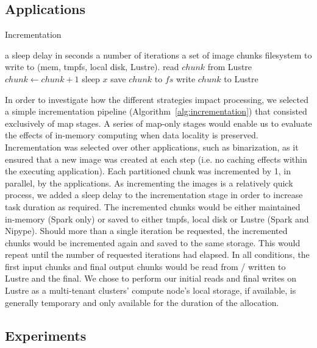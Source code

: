 \documentclass{IEEEtran}
\newcommand{\Desc}[2]{\State \makebox[2em][l]{#1}#2}
\begin{document}
\subsection{Applications} %
\begin{algorithm}\caption{Incrementation}\label{alg:incrementation}
    \begin{algorithmic}[1]
    \Input
    \Desc{$x$}{a sleep delay in seconds}
    \Desc{$n$}{a number of iterations}
    \Desc{$C$}{a set of image chunks}
    \Desc{$fs$}{filesystem to write to (mem, tmpfs, local disk, Lustre).}
    \EndInput
    \State read $chunk$ from Lustre
        \State $chunk\gets chunk+1$
        \State sleep $x$
        \State save $chunk$ to $fs$
        \EndIf
    \EndFor
    \State write $chunk$ to Lustre
    \EndFor
\end{algorithmic}
\end{algorithm}

In order to investigate how the different strategies impact processing, we 
selected a simple incrementation pipeline (Algorithm~\ref{alg:incrementation}) 
that consisted exclusively of map 
stages. A series of map-only stages would enable us to evaluate the effects of
in-memory computing when data locality is preserved. Incrementation was 
selected 
over other applications, such as binarization, as it ensured that a new image
was created at each step (i.e. no caching effects within the executing 
application). Each partitioned chunk was incremented by 1, in parallel, by
the applications. As incrementing the images is a relatively quick 
process, we added a sleep delay to the incrementation stage in order to 
increase task duration as required. The incremented chunks would be either 
maintained in-memory (Spark only) or saved to either tmpfs, local disk or 
Lustre (Spark and Nipype). Should more than a single iteration be requested, 
the incremented chunks would be incremented again and saved to the same storage. 
This would repeat until the number of requested iterations had elapsed. In all 
conditions, the first input chunks and final output chunks would be read from / written to  Lustre and the final. 
We chose to perform our initial 
reads and final writes on Lustre as a multi-tenant clusters' compute node's 
local storage, if 
available, is generally temporary and only available for the duration of the 
allocation. 

\subsection{Experiments}
\end{document}

